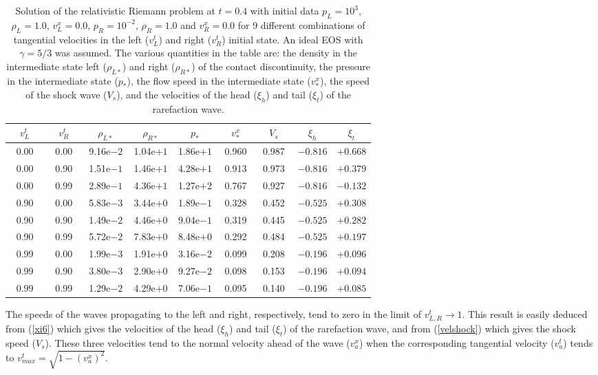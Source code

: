 \begin{table}
\begin{center}
\begin{tabular}{|cc|ccccccc|}
\hline\hline
$\quad v^t_L      \quad$ & $\quad v^t_R     \quad$ & 
$\quad \rho_{L*}  \quad$ & $\quad \rho_{R*} \quad$ & 
$\quad p_*        \quad$ & $\quad v^x_*     \quad$ & 
$\quad V_s        \quad$ & $\quad \xi_h     \quad$ & 
$\quad \xi_t      \quad$\\
\hline
0.00 & 0.00 & 9.16e$-2$&1.04e$+1$&1.86e$+1$& 0.960 & 0.987 &$-0.816$&$+0.668$\\
0.00 & 0.90 & 1.51e$-1$&1.46e$+1$&4.28e$+1$& 0.913 & 0.973 &$-0.816$&$+0.379$\\
0.00 & 0.99 & 2.89e$-1$&4.36e$+1$&1.27e$+2$& 0.767 & 0.927 &$-0.816$&$-0.132$\\
\hline
0.90 & 0.00 & 5.83e$-3$&3.44e$+0$&1.89e$-1$& 0.328 & 0.452 &$-0.525$&$+0.308$\\
0.90 & 0.90 & 1.49e$-2$&4.46e$+0$&9.04e$-1$& 0.319 & 0.445 &$-0.525$&$+0.282$\\
0.90 & 0.99 & 5.72e$-2$&7.83e$+0$&8.48e$+0$& 0.292 & 0.484 &$-0.525$&$+0.197$\\
\hline
0.99 & 0.00 & 1.99e$-3$&1.91e$+0$&3.16e$-2$& 0.099 & 0.208 &$-0.196$&$+0.096$\\
0.99 & 0.90 & 3.80e$-3$&2.90e$+0$&9.27e$-2$& 0.098 & 0.153 &$-0.196$&$+0.094$\\
0.99 & 0.99 & 1.29e$-2$&4.29e$+0$&7.06e$-1$& 0.095 & 0.140 &$-0.196$&$+0.085$\\
\hline\hline
\end{tabular}
\end{center}
\caption{Solution of the relativistic Riemann problem at $t=0.4$ with
initial data $p_L=10^3$, $\rho_L=1.0$, $v^x_L=0.0$, $p_R=10^{-2}$,
$\rho_R=1.0$ and $v^x_R=0.0$ for 9 different combinations of
tangential velocities in the left ($v^t_L$) and right ($v^t_R$)
initial state. An ideal EOS with $\gamma=5/3$ was assumed.  The
various quantities in the table are: the density in the intermediate
state left ($\rho_{L*}$) and right ($\rho_{R*}$) of the contact
discontinuity, the pressure in the intermediate state ($p_*$), the
flow speed in the intermediate state ($v^x_*$), the speed of the shock
wave ($V_s$), and the velocities of the head ($\xi_h$) and tail
($\xi_t$) of the rarefaction wave.}
\end{table}

The speeds of the waves propagating to the left and right,
respectively, tend to zero in the limit of $v^t_{L,R} \rightarrow 1$.
This result is easily deduced from (\ref{xi6}) which gives the
velocities of the head ($\xi_h$) and tail ($\xi_t$) of the rarefaction
wave, and from (\ref{velshock}) which gives the shock speed ($V_s$).
These three velocities tend to the normal velocity ahead of the wave
($v^x_a$) when the corresponding tangential velocity ($v^t_a$) tends
to $v^t_{max} = \sqrt{1-(v^x_a)^2}$.

